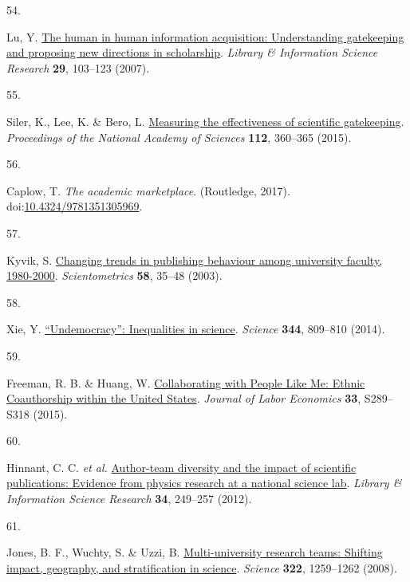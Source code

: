 \documentclass[
  man,floatsintext]{apa6}
\newlength{\cslhangindent}
\newlength{\csllabelwidth}
\newlength{\cslentryspacingunit} %
\newenvironment{CSLReferences}[2] %
 {%
  \setlength{\parindent}{0pt}
  \ifodd #1
  \let\oldpar\par
  \def\par{\hangindent=\cslhangindent\oldpar}
  \fi
  \setlength{\parskip}{#2\cslentryspacingunit}
 }%
 {}
\newcommand{\CSLLeftMargin}[1]{\parbox[t]{\csllabelwidth}{#1}}
\newcommand{\CSLRightInline}[1]{\parbox[t]{\linewidth - \csllabelwidth}{#1}\break}
\begin{document}
\begin{CSLReferences}{0}{0}
\leavevmode{}%
\CSLLeftMargin{54. }%
\CSLRightInline{Lu, Y. \href{https://doi.org/10.1016/j.lisr.2006.10.007}{The human in human information acquisition: Understanding gatekeeping and proposing new directions in scholarship}. \emph{Library \& Information Science Research} \textbf{29}, 103--123 (2007).}

\leavevmode{}%
\CSLLeftMargin{55. }%
\CSLRightInline{Siler, K., Lee, K. \& Bero, L. \href{https://doi.org/10.1073/pnas.1418218112}{Measuring the effectiveness of scientific gatekeeping}. \emph{Proceedings of the National Academy of Sciences} \textbf{112}, 360--365 (2015).}

\leavevmode{}%
\CSLLeftMargin{56. }%
\CSLRightInline{Caplow, T. \emph{The academic marketplace}. (Routledge, 2017). doi:\href{https://doi.org/10.4324/9781351305969}{10.4324/9781351305969}.}

\leavevmode{}%
\CSLLeftMargin{57. }%
\CSLRightInline{Kyvik, S. \href{https://doi.org/10.1023/A:1025475423482}{Changing trends in publishing behaviour among university faculty, 1980-2000}. \emph{Scientometrics} \textbf{58}, 35--48 (2003).}

\leavevmode{}%
\CSLLeftMargin{58. }%
\CSLRightInline{Xie, Y. \href{https://doi.org/10.1126/science.1252743}{{``}Undemocracy{''}: Inequalities in science}. \emph{Science} \textbf{344}, 809--810 (2014).}

\leavevmode{}%
\CSLLeftMargin{59. }%
\CSLRightInline{Freeman, R. B. \& Huang, W. \href{https://doi.org/10.1086/678973}{Collaborating with People Like Me: Ethnic Coauthorship within the United States}. \emph{Journal of Labor Economics} \textbf{33}, S289--S318 (2015).}

\leavevmode{}%
\CSLLeftMargin{60. }%
\CSLRightInline{Hinnant, C. C. \emph{et al.} \href{https://doi.org/10.1016/j.lisr.2012.03.001}{Author-team diversity and the impact of scientific publications: Evidence from physics research at a national science lab}. \emph{Library \& Information Science Research} \textbf{34}, 249--257 (2012).}

\leavevmode{}%
\CSLLeftMargin{61. }%
\CSLRightInline{Jones, B. F., Wuchty, S. \& Uzzi, B. \href{https://doi.org/10.1126/science.1158357}{Multi-university research teams: Shifting impact, geography, and stratification in science}. \emph{Science} \textbf{322}, 1259--1262 (2008).}


\end{CSLReferences}
\end{document}
